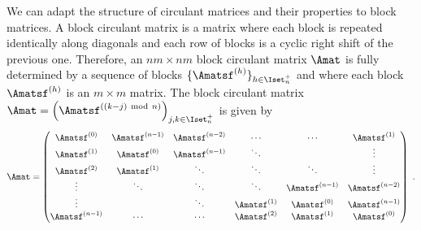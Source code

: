 We can adapt the structure of circulant matrices and their properties to block matrices.
A block circulant matrix is a matrix where each block is repeated identically along diagonals and each row of blocks is a cyclic right shift of the previous one.
Therefore, an $nm \times nm$ block circulant matrix $\Amat$ is fully determined by a sequence of blocks $\{\Amatsf^{(h)}\}_{h \in \Iset^+_n}$ and where each block $\Amatsf^{(h)}$ is an $m \times m$ matrix.
The block circulant matrix $\Amat = \leftmat \Amatsf^{((k-j) \mod n)} \rightmat_{j,k \in \Iset^+_n} $ is given by
\begin{equation}
  \Amat = 
  \leftmatrix
    \Amatsf^{(0)}   & \Amatsf^{(n-1)} & \Amatsf^{(n-2)} & \cdots        & \cdots          & \Amatsf^{(1)}   \\
    \Amatsf^{(1)}   & \Amatsf^{(0)}   & \Amatsf^{(n-1)} & \ddots        &                 & \vdots        \\
    \Amatsf^{(2)}   & \Amatsf^{(1)}   & \ddots          & \ddots        & \ddots          & \vdots        \\ 
    \vdots          & \ddots          & \ddots          & \ddots        & \Amatsf^{(n-1)} & \Amatsf^{(n-2)} \\
    \vdots          &                 & \ddots          & \Amatsf^{(1)} & \Amatsf^{(0)}   & \Amatsf^{(n-1)} \\
    \Amatsf^{(n-1)} & \cdots          & \cdots          & \Amatsf^{(2)} & \Amatsf^{(1)}   & \Amatsf^{(0)}
  \rightmatrix \enspace.
\end{equation}

